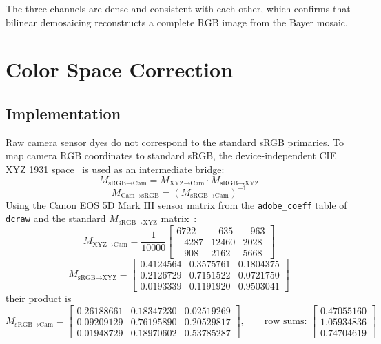 \documentclass[a4paper]{article}
\begin{document}
The three channels are dense and consistent with each other, which confirms that bilinear demosaicing reconstructs a complete RGB image from the Bayer mosaic.

\section{Color Space Correction}

\subsection{Implementation}
Raw camera sensor dyes do not correspond to the standard sRGB primaries. To map camera RGB coordinates to standard sRGB, the device-independent CIE XYZ 1931 space~\cite{cie1931} is used as an intermediate bridge:
\begin{equation}
    M_{\text{sRGB}\to\text{Cam}} = M_{\text{XYZ}\to\text{Cam}} \cdot M_{\text{sRGB}\to\text{XYZ}}
\end{equation}
\begin{equation}
    M_{\text{Cam}\to\text{sRGB}} = \left(M_{\text{sRGB}\to\text{Cam}}\right)^{-1}
\end{equation}
Using the Canon EOS 5D Mark III sensor matrix from the \texttt{adobe\_coeff} table of \texttt{dcraw} and the standard $M_{\text{sRGB}\to\text{XYZ}}$ matrix~\cite{iec1999srgb}:
\begin{equation}
    M_{\text{XYZ}\to\text{Cam}} = \frac{1}{10000}\begin{bmatrix} 6722 & -635 & -963 \\ -4287 & 12460 & 2028 \\ -908 & 2162 & 5668 \end{bmatrix}
\end{equation}
\begin{equation}
    M_{\text{sRGB}\to\text{XYZ}} = \begin{bmatrix} 0.4124564 & 0.3575761 & 0.1804375 \\ 0.2126729 & 0.7151522 & 0.0721750 \\ 0.0193339 & 0.1191920 & 0.9503041 \end{bmatrix}
\end{equation}
their product is
\begin{equation}
    M_{\text{sRGB}\to\text{Cam}} = \begin{bmatrix}
    0.26188661 & 0.18347230 & 0.02519269 \\
    0.09209129 & 0.76195890 & 0.20529817 \\
    0.01948729 & 0.18970602 & 0.53785287
    \end{bmatrix},
    \qquad \text{row sums: } \begin{bmatrix} 0.47055160 \\ 1.05934836 \\ 0.74704619 \end{bmatrix}
    \label{eq:srgb2cam}
\end{equation}
\end{document}
